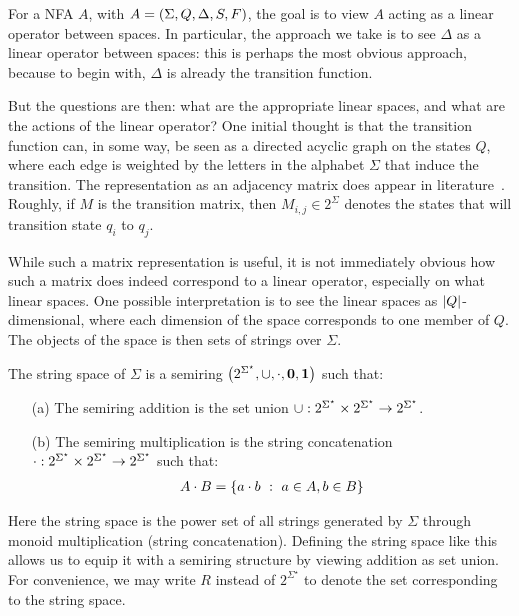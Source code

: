 For a NFA \(A\), with \(A = \left(\Sigma, Q, \Delta, S, F\right)\),
the goal is to view \(A\) acting as a linear operator between spaces.
In particular, the approach we take is to see \(\Delta\) as a
linear operator between spaces: this is perhaps the most obvious approach,
because to begin with, \(\Delta\) is already the transition function.

But the questions are then:
what are the appropriate linear spaces,
and what are the actions of the linear operator?
One initial thought is that the transition function can, in some way,
be seen as a directed acyclic graph on the states \(Q\),
where each edge is weighted by the letters in the alphabet \(\Sigma\)
that induce the transition.
The representation as an adjacency matrix does appear in
literature~\cite{savage1998models}.
Roughly, if \(M\) is the transition matrix, then \(M_{i, j} \in 2^{\Sigma}\)
denotes the states that will transition state \(q_i\) to \(q_j\).

While such a matrix representation is useful,
it is not immediately obvious how such a matrix does indeed correspond
to a linear operator, especially on what linear spaces.
One possible interpretation is to see
the linear spaces as \(\left\lvert Q\right\rvert\)-dimensional,
where each dimension of the space corresponds to one member of \(Q\).
The objects of the space is then sets of strings over \(\Sigma\).

\begin{definition}
  The string space of \(\Sigma\) is a semiring
  \(\left(2^{\Sigma^\star}, \cup, \cdot, \mathbf{0}, \mathbf{1}\right)\)
  such that:
  \begin{enumerate}
    \item[(a)]
      The semiring addition is the set union
      \(\cup : 2^{\Sigma^\star} \times
        2^{\Sigma^\star} \to 2^{\Sigma^\star}\).

    \item[(b)]
      The semiring multiplication is the string concatenation
      \(\cdot : 2^{\Sigma^\star} \times
        2^{\Sigma^\star} \to 2^{\Sigma^\star}\)
      such that:
      \begin{align*}
        A \cdot B
          = \left\{a \cdot b \  : \  a \in A, b \in B\right\}
      \end{align*}
  \end{enumerate}
\end{definition}

Here the string space is the power set of all strings generated
by \(\Sigma\) through monoid multiplication (string concatenation).
Defining the string space like this allows us to equip it with a semiring
structure by viewing addition as set union.
For convenience,
we may write \(R\) instead of \(2^{\Sigma^\star}\)
to denote the set corresponding to the string space.

